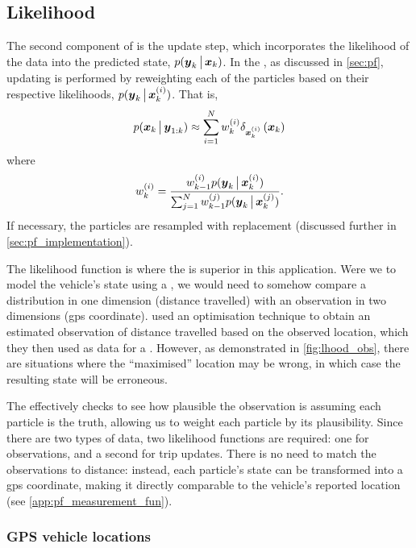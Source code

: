 \subsection{Likelihood}
\label{sec:pf-likelihood}

The second component of  is the update step, which incorporates the likelihood of the data into the predicted state, $p(\boldsymbol{y}_k \,\big|\,{} \boldsymbol x_k)$. In the \pf{}, as discussed in \cref{sec:pf}, updating is performed by reweighting each of the particles based on their respective likelihoods, $p(\boldsymbol{y}_k \,\big|\,{} \boldsymbol x^{(i)}_k)$. That is,
\begin{equation}
\label{eq:vehicle_pf_update}
p(\Vstate_k \cond{} \Vobs_{1:k}) \approx
\sum_{i=1}^\Np
    \Pwt_{k}
    \DiracMeasure{\Vstate\vi_k}{\Vstate_k}
\end{equation}
where
\begin{equation}
\label{eq:vehicle_pf_reweight}
\Pwt_k = \frac{
    \Pwt_{k-1} p(\Vobs_k \cond{} \Vstate\vi_k)
}{
    \sum_{j=1}^\Np \Pwt[j]_{k-1} p(\Vobs_k \cond{} \Vstate\vi[j]_k)
}.
\end{equation}
If necessary, the particles are resampled with replacement (discussed further in \cref{sec:pf_implementation}).


The likelihood function is where the \pf{} is superior in this application. Were we to model the vehicle's state using a \kf{}, we would need to somehow compare a distribution in one dimension (distance travelled) with an observation in two dimensions (\gls{gps} coordinate). \citet{Cathey_2003} used an optimisation technique to obtain an estimated observation of distance travelled based on the observed location, which they then used as data for a \kf{}. However, as demonstrated in \cref{fig:lhood_obs}, there are situations where the ``maximised'' location may be wrong, in which case the resulting state will be erroneous.


The \pf{} effectively checks to see how plausible the observation is assuming each particle is the truth, allowing us to weight each particle by its plausibility. Since there are two types of data, two likelihood functions are required: one for \GPS{} observations, and a second for trip updates. There is no need to match the observations to distance: instead, each particle's state can be transformed into a \gls{gps} coordinate, making it directly comparable to the vehicle's reported location (see \cref{app:pf_measurement_fun}).


\subsubsection{GPS vehicle locations}
\label{sec:lhood_gps}

